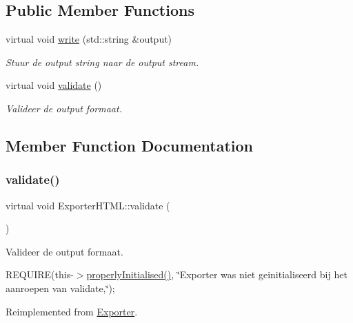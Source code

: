 \subsection*{Public Member Functions}
\begin{DoxyCompactItemize}
\item 
virtual void \hyperlink{class_exporter_h_t_m_l_aa14cd2dde581c96a0414ad3e886a38c8}{write} (std\+::string \&output)
\begin{DoxyCompactList}\small\item\em Stuur de output string naar de output stream. \end{DoxyCompactList}\item 
virtual void \hyperlink{class_exporter_h_t_m_l_ac44697b53a77a01e394a12bfc11c93f1}{validate} ()
\begin{DoxyCompactList}\small\item\em Valideer de output formaat. \end{DoxyCompactList}\end{DoxyCompactItemize}


\subsection{Member Function Documentation}
\mbox{\label{class_exporter_h_t_m_l_ac44697b53a77a01e394a12bfc11c93f1}} 
\subsubsection{\texorpdfstring{validate()}{validate()}}
{\footnotesize\ttfamily virtual void Exporter\+H\+T\+M\+L\+::validate (\begin{DoxyParamCaption}{ }\end{DoxyParamCaption})\hspace{0.3cm}{\ttfamily [virtual]}}



Valideer de output formaat. 

R\+E\+Q\+U\+I\+RE(this-\/$>$\hyperlink{class_exporter_afb6185b8276c2fd03da53f49e4da295b}{properly\+Initialised()}, \char`\"{}\+Exporter was niet geinitialiseerd bij het aanroepen van validate,\char`\"{});~\newline


Reimplemented from \hyperlink{class_exporter_a585f97d4204275edcb831df9215a0099}{Exporter}.

